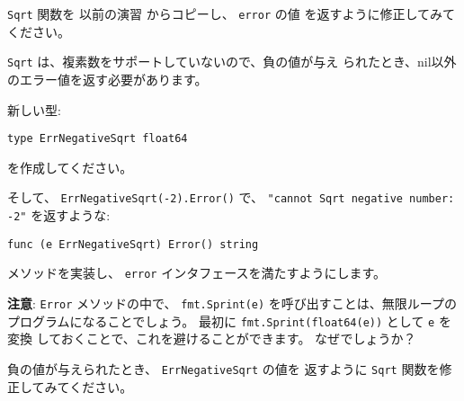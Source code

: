\texttt{Sqrt} 関数を 以前の演習 からコピーし、 \texttt{error} の値
を返すように修正してみてください。

\texttt{Sqrt} は、複素数をサポートしていないので、負の値が与え
られたとき、nil以外のエラー値を返す必要があります。

新しい型:

\begin{lstlisting}[numbers=none]
type ErrNegativeSqrt float64
\end{lstlisting}
を作成してください。

そして、 \texttt{ErrNegativeSqrt(-2).Error()} で、
\texttt{"cannot Sqrt negative number: -2"} を返すような:

\begin{lstlisting}[numbers=none]
func (e ErrNegativeSqrt) Error() string
\end{lstlisting}
メソッドを実装し、 \texttt{error} インタフェースを満たすようにします。

\textbf{注意}: \texttt{Error} メソッドの中で、 \texttt{fmt.Sprint(e)}
を呼び出すことは、無限ループのプログラムになることでしょう。 最初に
\texttt{fmt.Sprint(float64(e))} として \texttt{e} を変換
しておくことで、これを避けることができます。 なぜでしょうか？

負の値が与えられたとき、 \texttt{ErrNegativeSqrt} の値を
返すように \texttt{Sqrt} 関数を修正してみてください。